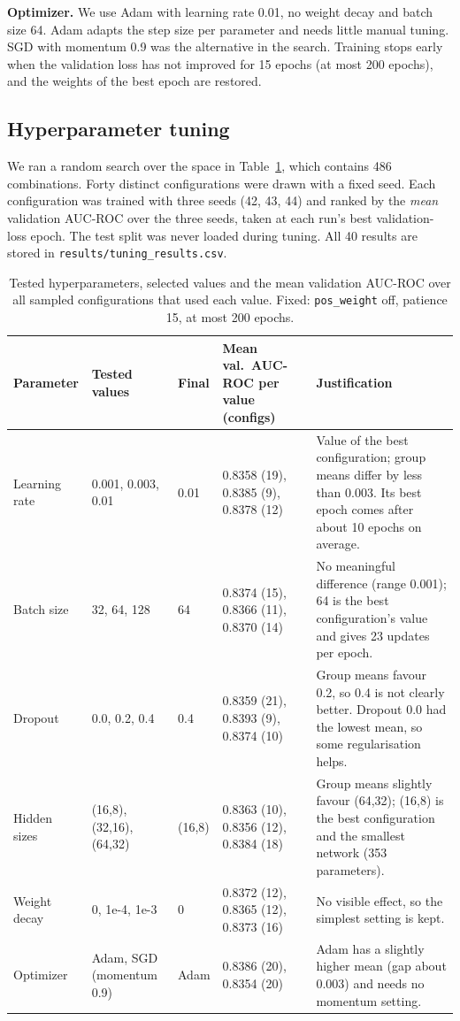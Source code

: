 \documentclass[11pt,a4paper]{article}
\newcommand{\auc}{AUC-ROC}
\begin{document}
\textbf{Optimizer.} We use Adam with learning rate 0.01, no weight decay and batch size 64. Adam adapts the step size
per parameter and needs little manual tuning. SGD with momentum 0.9 was the alternative in the search.
Training stops early when the validation loss has not improved for 15 epochs (at most 200 epochs), and the weights
of the best epoch are restored.

\subsection{Hyperparameter tuning}
\label{sec:tuning}
We ran a random search over the space in Table~\ref{tab:tuning}, which contains 486 combinations. Forty distinct
configurations were drawn with a fixed seed. Each configuration was trained with three seeds (42, 43, 44) and ranked by
the \emph{mean} validation \auc{} over the three seeds, taken at each run's best validation-loss epoch. The test split
was never loaded during tuning. All 40 results are stored in \texttt{results/tuning\_results.csv}.

\begin{table}[!htb]
\centering
\footnotesize
\begin{tabular}{p{1.8cm}p{2.4cm}p{1.2cm}p{3.2cm}p{5.2cm}}
\toprule
Parameter & Tested values & Final & Mean val.\ \auc{} per value (configs) & Justification \\
\midrule
Learning rate & 0.001, 0.003, 0.01 & 0.01 & 0.8358 (19), 0.8385 (9), 0.8378 (12) & Value of the best configuration; group means differ by less than 0.003. Its best epoch comes after about 10 epochs on average. \\
Batch size & 32, 64, 128 & 64 & 0.8374 (15), 0.8366 (11), 0.8370 (14) & No meaningful difference (range 0.001); 64 is the best configuration's value and gives 23 updates per epoch. \\
Dropout & 0.0, 0.2, 0.4 & 0.4 & 0.8359 (21), 0.8393 (9), 0.8374 (10) & Group means favour 0.2, so 0.4 is not clearly better. Dropout 0.0 had the lowest mean, so some regularisation helps. \\
Hidden sizes & (16,8), (32,16), (64,32) & (16,8) & 0.8363 (10), 0.8356 (12), 0.8384 (18) & Group means slightly favour (64,32); (16,8) is the best configuration and the smallest network (353 parameters). \\
Weight decay & 0, 1e-4, 1e-3 & 0 & 0.8372 (12), 0.8365 (12), 0.8373 (16) & No visible effect, so the simplest setting is kept. \\
Optimizer & Adam, SGD (momentum 0.9) & Adam & 0.8386 (20), 0.8354 (20) & Adam has a slightly higher mean (gap about 0.003) and needs no momentum setting. \\
\bottomrule
\end{tabular}
\caption{Tested hyperparameters, selected values and the mean validation \auc{} over all sampled configurations that used
each value. Fixed: \texttt{pos\_weight} off, patience 15, at most 200 epochs.}
\label{tab:tuning}
\end{table}
\end{document}
